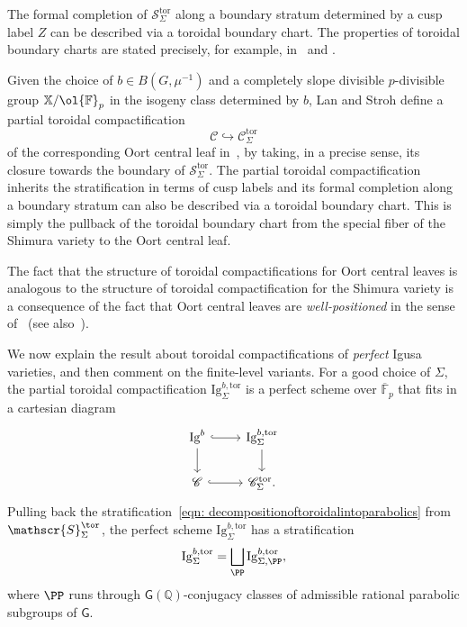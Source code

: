 \documentclass[letterpaper,11pt]{amsart}
\begin{document}
The formal completion of $\mathscr{S}_{\Sigma}^{\mathrm{tor}}$ along a boundary stratum determined by a cusp label $Z$ can be described via a toroidal boundary chart. The properties of toroidal boundary charts are stated precisely, for example, in~\cite[Theorem 2.5.9]{CS2} and \cite[Theorem 6.4.1.1]{lan-thesis}. 

Given the choice of $b\in B(G,\mu^{-1})$ and a completely slope divisible $p$-divisible group $\mathbb{X}/\ol{\mathbb{F}}_p$ in the isogeny class determined by $b$, Lan and Stroh define a partial toroidal compactification
\[
\mathscr{C}\hookrightarrow \mathscr{C}_{\Sigma}^{\mathrm{tor}}
\]
of the corresponding Oort central leaf in~\cite[\S 3.4]{LanStroh}, by taking, in a precise sense, its closure towards the boundary of $\mathscr{S}_{\Sigma}^{\mathrm{tor}}$. The partial toroidal compactification inherits the stratification in terms of cusp labels and its formal completion along a boundary stratum can also be described via a toroidal boundary chart. This is simply the pullback of the toroidal boundary chart from the special fiber of the Shimura variety to the Oort central leaf. 

\begin{remark} The fact that the structure of toroidal compactifications for Oort central leaves is analogous to the structure of toroidal compactification for the Shimura variety is a consequence of the fact that Oort central leaves are \emph{well-positioned} in the sense of~\cite[\S 2.2]{LanStroh} (see also~\cite[\S 3.4]{Boxer}). 
\end{remark}

We now explain the result about toroidal compactifications of \emph{perfect} Igusa varieties, and then comment on the finite-level variants. For a good choice of $\Sigma$, the partial toroidal compactification $\mathrm{Ig}^{b,\mathrm{tor}}_{\Sigma}$ is a perfect scheme over $\overline{\mathbb{F}}_p$ that fits in a cartesian diagram 
\[
\begin{tikzcd}
\mathrm{Ig}^b \arrow[d] \arrow[r, hook] & \mathrm{Ig}^{b,\mathrm{tor}}_{\Sigma}\arrow[d] \\ 
\mathscr{C} \arrow[r, hook] & \mathscr{C}^{\mathrm{tor}}_{\Sigma}.
\end{tikzcd}
\]
Pulling back the stratification~\eqref{eqn: decompositionoftoroidalintoparabolics} from $\mathscr{S}_\Sigma^{\tor}$, the perfect scheme $\mathrm{Ig}^{b,\mathrm{tor}}_{\Sigma}$ has a stratification
\begin{equation}{\label{eqn: BoudnaryStrataofToroidal}}
\mathrm{Ig}^{b,\mathrm{tor}}_{\Sigma} = \bigsqcup_{\PP}
\mathrm{Ig}^{b,\mathrm{tor}}_{\Sigma, \PP},
\end{equation}
where $\PP$ runs through $\mathsf{G}(\mathbb{Q})$-conjugacy classes of admissible rational parabolic subgroups of $\mathsf{G}$.  
\end{document}
